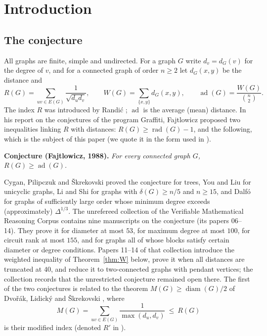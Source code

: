 \documentclass[11pt,a4paper]{article}
\theoremstyle{definition}
\theoremstyle{remark}
\numberwithin{equation}{section}
\newcommand{\ad}{\operatorname{ad}}
\newcommand{\diam}{\operatorname{diam}}
\begin{document}
\tableofcontents

\section{Introduction}\label{sec:intro}

\subsection{The conjecture}
All graphs are finite, simple and undirected. For a graph $G$ write $d_v=d_G(v)$
for the degree of $v$, and for a connected graph of order $n\ge2$ let $d_G(x,y)$
be the distance and
\[
 R(G)=\sum_{uv\in E(G)}\frac1{\sqrt{d_ud_v}},\qquad
 W(G)=\sum_{\{x,y\}}d_G(x,y),\qquad \ad(G)=\frac{W(G)}{\binom n2}.
\]
The index $R$ was introduced by Randi\'c \cite{Randic}; $\ad$ is the average
(mean) distance. In his report on the conjectures of the program Graffiti,
Fajtlowicz \cite{Faj} proposed two inequalities linking $R$ with distances:
$R(G)\ge\operatorname{rad}(G)-1$, and the following, which is the subject of
this paper (we quote it in the form used in \cite{CPS,YL,LiShi}).

\medskip\noindent\textbf{Conjecture (Fajtlowicz, 1988).}
\emph{For every connected graph $G$, $R(G)\ge\ad(G)$.}
\medskip

Cygan, Pilipczuk and \v{S}krekovski \cite{CPS} proved the conjecture for trees, You
and Liu \cite{YL} for unicyclic graphs, Li and Shi \cite{LiShi} for graphs with
$\delta(G)\ge n/5$ and $n\ge15$, and Dalf\'o \cite{Dalfo} for graphs of sufficiently
large order whose minimum degree exceeds (approximately) $\Delta^{1/3}$. The
unrefereed collection \cite{VMRC189} of the Verifiable Mathematical Reasoning
Corpus contains nine manuscripts on the conjecture (its papers 06--14). They prove
it for diameter at most $53$, for maximum degree at most $100$, for circuit rank at
most $155$, and for graphs all of whose blocks satisfy certain diameter or degree
conditions. Papers 11--14 of that collection introduce the weighted inequality of
Theorem~\ref{thm:W} below, prove it when all distances are truncated at $40$, and
reduce it to two-connected graphs with pendant vertices; the collection records
that the unrestricted conjecture remained open there. The first of the two
conjectures is related to the theorem $M(G)\ge\diam(G)/2$ of Dvo\v{r}\'ak,
Lidick\'y and \v{S}krekovski \cite{DLS}, where
\[
 M(G)=\sum_{uv\in E(G)}\frac1{\max(d_u,d_v)}\ \le\ R(G)
\]
is their modified index (denoted $R'$ in \cite{DLS}).
\end{document}
